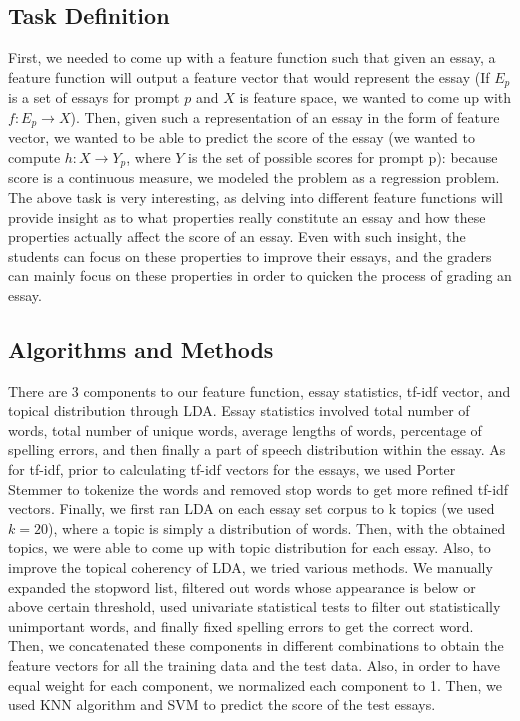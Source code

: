 \documentclass{article}
\begin{document}
\subsection{Task Definition}
First, we needed to come up with a feature function such that given an essay, a feature function will output a feature vector that would represent the essay (If $E_p$ is a set of essays for prompt $p$ and $X$ is feature space, we wanted to come up with $f: E_p \rightarrow X$). Then, given such a representation of an essay in the form of feature vector, we wanted to be able to predict the score of the essay (we wanted to compute $h: X \rightarrow Y_p$, where $Y$ is the set of possible scores for prompt p): because score is a continuous measure, we modeled the problem as a regression problem.
The above task is very interesting, as delving into different feature functions will provide insight as to what properties really constitute an essay and how these properties actually affect the score of an essay. Even with such insight, the students can focus on these properties to improve their essays, and the graders can mainly focus on these properties in order to quicken the process of grading an essay.

\subsection{Algorithms and Methods}
There are 3 components to our feature function, essay statistics, tf-idf vector, and topical distribution through LDA. Essay statistics involved total number of words, total number of unique words, average lengths of words, percentage of spelling errors, and then finally a part of speech distribution within the essay. As for tf-idf, prior to calculating tf-idf vectors for the essays, we used Porter Stemmer to tokenize the words and removed stop words to get more refined tf-idf vectors. Finally, we first ran LDA on each essay set corpus to k topics (we used $k=20$), where a topic is simply a distribution of words. Then, with the obtained topics, we were able to come up with topic distribution for each essay.
Also, to improve the topical coherency of LDA, we tried various methods. We manually expanded the stopword list, filtered out words whose appearance is below or above certain threshold, used univariate statistical tests to filter out statistically unimportant words, and finally fixed spelling errors to get the correct word.
Then, we concatenated these components in different combinations to obtain the feature vectors for all the training data and the test data. Also, in order to have equal weight for each component, we normalized each component to 1. Then, we used KNN algorithm and SVM to predict the score of the test essays. 
\end{document}
